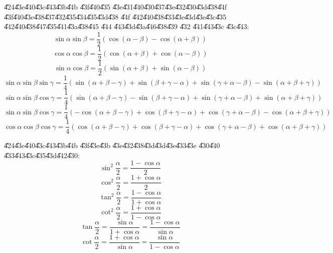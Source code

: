 \documentclass{article}
\begin{document}
\U{424}\U{43e}\U{440}\U{43c}\U{443}\U{43b}\U{44b} \U{43f}\U{440}\U{435}%
\U{43e}\U{431}\U{440}\U{430}\U{437}\U{43e}\U{432}\U{430}\U{43d}\U{438}\U{44f}
\U{43f}\U{440}\U{43e}\U{438}\U{437}\U{432}\U{435}\U{434}\U{435}\U{43d}\U{438}%
\U{44f} \U{442}\U{440}\U{438}\U{433}\U{43e}\U{43d}\U{43e}\U{43c}\U{435}%
\U{442}\U{440}\U{438}\U{447}\U{435}\U{441}\U{43a}\U{438}\U{445} \U{444}%
\U{443}\U{43d}\U{43a}\U{446}\U{438}\U{439} \U{432} \U{441}\U{443}\U{43c}%
\U{43c}\U{443}:%
\[
\sin \alpha \sin \beta =\frac{1}{2}\left( \cos \left( \alpha -\beta \right)
-\cos \left( \alpha +\beta \right) \right) 
\]%
\[
\cos \alpha \cos \beta =\frac{1}{2}\left( \cos \left( \alpha +\beta \right)
+\cos \left( \alpha -\beta \right) \right) 
\]%
\[
\sin \alpha \cos \beta =\frac{1}{2}\left( \sin \left( \alpha +\beta \right)
+\sin \left( \alpha -\beta \right) \right) 
\]%
\[
\sin \alpha \sin \beta \sin \gamma =\frac{1}{4}\left( \sin \left( \alpha
+\beta -\gamma \right) +\sin \left( \beta +\gamma -\alpha \right) +\sin
\left( \gamma +\alpha -\beta \right) -\sin \left( \alpha +\beta +\gamma
\right) \right) 
\]%
\[
\sin \alpha \sin \beta \cos \gamma =\frac{1}{4}\left( \sin \left( \alpha
+\beta -\gamma \right) -\sin \left( \beta +\gamma -\alpha \right) +\sin
\left( \gamma +\alpha -\beta \right) +\sin \left( \alpha +\beta +\gamma
\right) \right) 
\]%
\[
\sin \alpha \sin \beta \cos \gamma =\frac{1}{4}\left( -\cos \left( \alpha
+\beta -\gamma \right) +\cos \left( \beta +\gamma -\alpha \right) +\cos
\left( \gamma +\alpha -\beta \right) -\cos \left( \alpha +\beta +\gamma
\right) \right) 
\]%
\[
\cos \alpha \cos \beta \cos \gamma =\frac{1}{4}\left( \cos \left( \alpha
+\beta -\gamma \right) +\cos \left( \beta +\gamma -\alpha \right) +\cos
\left( \gamma +\alpha -\beta \right) +\cos \left( \alpha +\beta +\gamma
\right) \right) 
\]

\U{424}\U{43e}\U{440}\U{43c}\U{443}\U{43b}\U{44b} \U{43f}\U{43e}\U{43b}%
\U{43e}\U{432}\U{438}\U{43d}\U{43d}\U{43e}\U{433}\U{43e} \U{430}\U{440}%
\U{433}\U{443}\U{43c}\U{435}\U{43d}\U{442}\U{430}:%
\[
\sin ^{2}\frac{\alpha }{2}=\frac{1-\cos \alpha }{2} 
\]%
\[
\cos ^{2}\frac{\alpha }{2}=\frac{1+\cos \alpha }{2} 
\]%
\[
\tan ^{2}\frac{\alpha }{2}=\frac{1-\cos \alpha }{1+\cos \alpha } 
\]%
\[
\cot ^{2}\frac{\alpha }{2}=\frac{1+\cos \alpha }{1-\cos \alpha } 
\]%
\[
\tan \frac{\alpha }{2}=\frac{\sin \alpha }{1+\cos \alpha }=\frac{1-\cos
\alpha }{\sin \alpha } 
\]%
\[
\cot \frac{\alpha }{2}=\frac{1+\cos \alpha }{\sin \alpha }=\frac{\sin \alpha 
}{1-\cos \alpha } 
\]
\end{document}
